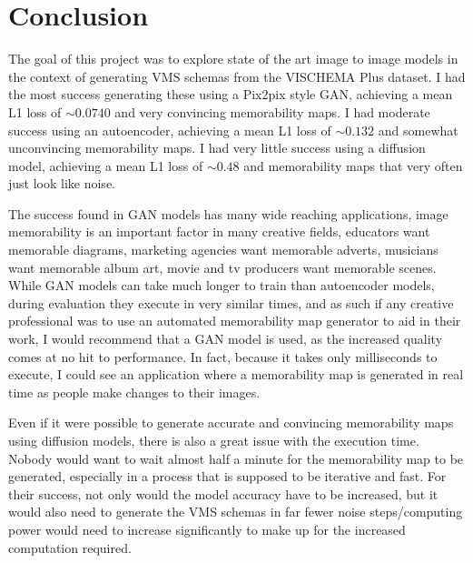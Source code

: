 \documentclass{UoYCSproject}
\begin{document}
\chapter{Conclusion}



The goal of this project was to explore state of the art image to image models in the context of generating VMS schemas from the VISCHEMA Plus dataset. I had the most success generating these using a Pix2pix style GAN, achieving a mean L1 loss of \(\sim 0.0740 \) and very convincing memorability maps. I had moderate success using an autoencoder, achieving a mean L1 loss of \(\sim 0.132\) and somewhat unconvincing memorability maps. I had very little success using a diffusion model, achieving a mean L1 loss of \(\sim 0.48 \) and memorability maps that very often just look like noise.

The success found in GAN models has many wide reaching applications, image memorability is an important factor in many creative fields, educators want memorable diagrams, marketing agencies want memorable adverts, musicians want memorable album art, movie and tv producers want memorable scenes. While GAN models can take much longer to train than autoencoder models, during evaluation they execute in very similar times, and as such if any creative professional was to use an automated memorability map generator to aid in their work, I would recommend that a GAN model is used, as the increased quality comes at no hit to performance. In fact, because it takes only milliseconds to execute, I could see an application where a memorability map is generated in real time as people make changes to their images.

Even if it were possible to generate accurate and convincing memorability maps using diffusion models, there is also a great issue with the execution time. Nobody would want to wait almost half a minute for the memorability map to be generated, especially in a process that is supposed to be iterative and fast. For their success, not only would the model accuracy have to be increased, but it would also need to generate the VMS schemas in far fewer noise steps/computing power would need to increase significantly to make up for the increased computation required. 
\end{document}
